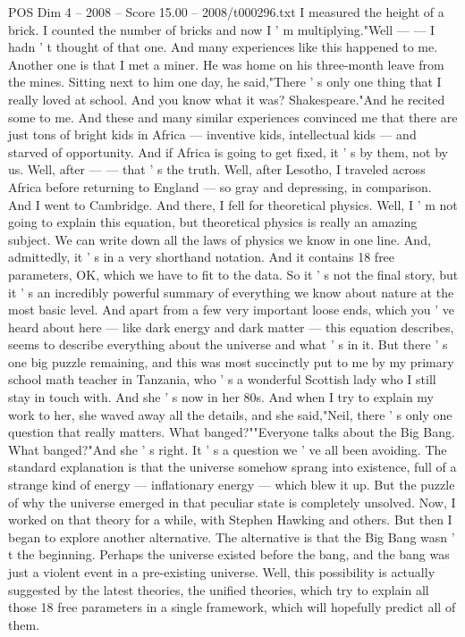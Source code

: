 \begin{textsample}{POS Dim 4 – 2008 – Score 15.00 – 2008/t000296.txt}
I measured the height of a brick.
I counted the number of bricks and now I ' m multiplying."Well — — I hadn ' t thought of that one.
And many experiences like this happened to me.
Another one is that I met a miner.
He was home on his three-month leave from the mines.
Sitting next to him one day, he said,"There ' s only one thing that I really loved at school.
And you know what it was?
Shakespeare."And he recited some to me.
And these and many similar experiences convinced me that there are just tons of bright kids in Africa — inventive kids, intellectual kids — and starved of opportunity.
And if Africa is going to get fixed, it ' s by them, not by us.
Well, after — — that ' s the truth.
Well, after Lesotho, I traveled across Africa before returning to England — so gray and depressing, in comparison.
And I went to Cambridge.
And there, I fell for theoretical physics.
Well, I ' m not going to explain this equation, but theoretical physics is really an amazing subject.
We can write down all the laws of physics we know in one line.
And, admittedly, it ' s in a very shorthand notation.
And it contains 18 free parameters, OK, which we have to fit to the data.
So it ' s not the final story, but it ' s an incredibly powerful summary of everything we know about nature at the most basic level.
And apart from a few very important loose ends, which you ' ve heard about here — like dark energy and dark matter — this equation describes, seems to describe everything about the universe and what ' s in it.
But there ' s one big puzzle remaining, and this was most succinctly put to me by my primary school math teacher in Tanzania, who ' s a wonderful Scottish lady who I still stay in touch with.
And she ' s now in her 80s.
And when I try to explain my work to her, she waved away all the details, and she said,"Neil, there ' s only one question that really matters.
What banged?""Everyone talks about the Big Bang.
What banged?"And she ' s right.
It ' s a question we ' ve all been avoiding.
The standard explanation is that the universe somehow sprang into existence, full of a strange kind of energy — inflationary energy — which blew it up.
But the puzzle of why the universe emerged in that peculiar state is completely unsolved.
Now, I worked on that theory for a while, with Stephen Hawking and others.
But then I began to explore another alternative.
The alternative is that the Big Bang wasn ' t the beginning.
Perhaps the universe existed before the bang, and the bang was just a violent event in a pre-existing universe.
Well, this possibility is actually suggested by the latest theories, the unified theories, which try to explain all those 18 free parameters in a single framework, which will hopefully predict all of them.

\end{textsample}
